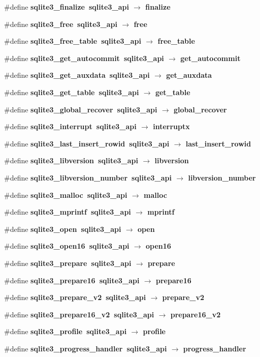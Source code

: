 \begin{CompactItemize}
\item 
\#define \bf{sqlite3\_\-finalize}~sqlite3\_\-api $\rightarrow$ finalize
\item 
\#define \bf{sqlite3\_\-free}~sqlite3\_\-api $\rightarrow$ free
\item 
\#define \bf{sqlite3\_\-free\_\-table}~sqlite3\_\-api $\rightarrow$ free\_\-table
\item 
\#define \bf{sqlite3\_\-get\_\-autocommit}~sqlite3\_\-api $\rightarrow$ get\_\-autocommit
\item 
\#define \bf{sqlite3\_\-get\_\-auxdata}~sqlite3\_\-api $\rightarrow$ get\_\-auxdata
\item 
\#define \bf{sqlite3\_\-get\_\-table}~sqlite3\_\-api $\rightarrow$ get\_\-table
\item 
\#define \bf{sqlite3\_\-global\_\-recover}~sqlite3\_\-api $\rightarrow$ global\_\-recover
\item 
\#define \bf{sqlite3\_\-interrupt}~sqlite3\_\-api $\rightarrow$ interruptx
\item 
\#define \bf{sqlite3\_\-last\_\-insert\_\-rowid}~sqlite3\_\-api $\rightarrow$ last\_\-insert\_\-rowid
\item 
\#define \bf{sqlite3\_\-libversion}~sqlite3\_\-api $\rightarrow$ libversion
\item 
\#define \bf{sqlite3\_\-libversion\_\-number}~sqlite3\_\-api $\rightarrow$ libversion\_\-number
\item 
\#define \bf{sqlite3\_\-malloc}~sqlite3\_\-api $\rightarrow$ malloc
\item 
\#define \bf{sqlite3\_\-mprintf}~sqlite3\_\-api $\rightarrow$ mprintf
\item 
\#define \bf{sqlite3\_\-open}~sqlite3\_\-api $\rightarrow$ open
\item 
\#define \bf{sqlite3\_\-open16}~sqlite3\_\-api $\rightarrow$ open16
\item 
\#define \bf{sqlite3\_\-prepare}~sqlite3\_\-api $\rightarrow$ prepare
\item 
\#define \bf{sqlite3\_\-prepare16}~sqlite3\_\-api $\rightarrow$ prepare16
\item 
\#define \bf{sqlite3\_\-prepare\_\-v2}~sqlite3\_\-api $\rightarrow$ prepare\_\-v2
\item 
\#define \bf{sqlite3\_\-prepare16\_\-v2}~sqlite3\_\-api $\rightarrow$ prepare16\_\-v2
\item 
\#define \bf{sqlite3\_\-profile}~sqlite3\_\-api $\rightarrow$ profile
\item 
\#define \bf{sqlite3\_\-progress\_\-handler}~sqlite3\_\-api $\rightarrow$ progress\_\-handler

\end{CompactItemize}
